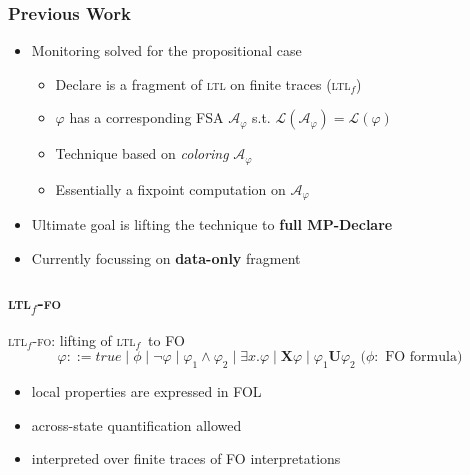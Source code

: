 \documentclass{beamer}
\newcommand{\A}{\mathcal A\xspace}
\renewcommand{\L}{\mathcal L\xspace}
\newcommand{\nextX}{\mathbf{X}\xspace}
\newcommand{\ltlX}{\nextX}
\newcommand{\ltlU}{\mathbf{U}}
\newcommand{\true}{true}
\newcommand{\ltl}{\textsc{ltl}\xspace}
\newcommand{\ltlf}{\textsc{ltl}$_f$\xspace}
\newcommand{\ltlffo}{\ltlf-\textsc{fo}\xspace}
\begin{document}
\begin{frame}
\frametitle{Previous Work}

\begin{itemize}
	\item Monitoring solved for the propositional case~\cite{}
	\begin{itemize}
		\item Declare is a fragment of \ltl on finite traces (\ltlf)
		\item $\varphi$ has a corresponding FSA $\A_\varphi$ s.t. $\L(\A_\varphi)=\L(\varphi)$
		\item Technique based on \emph{coloring} $\A_\varphi$
		\item Essentially a  fixpoint computation on $\A_\varphi$
	\end{itemize}
\end{itemize}

\begin{itemize}
	\item Ultimate goal is lifting the technique to {\bf full MP-Declare}
	\item Currently focussing on {\bf data-only} fragment
\end{itemize}

\end{frame}

\begin{frame}
\frametitle{\ltlffo}

\ltlffo: lifting of \ltlf~to FO
\[
  \varphi ::=  \true \mid \phi  \mid \lnot \varphi \mid \varphi_1 \land \varphi_2 \mid \exists
  x.\varphi \mid \ltlX{\varphi}  \mid \varphi_1 \ltlU \varphi_2\text{ (}\phi:\text{ FO formula)} 
\]



\begin{itemize}	
	\item local properties are expressed in FOL
	\item across-state quantification allowed
	\item interpreted over finite traces of FO interpretations
\end{itemize}

\end{frame}
\end{document}
